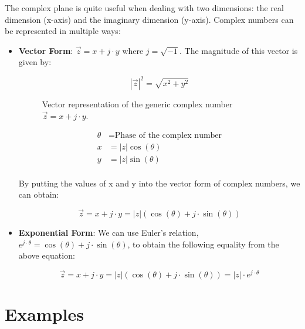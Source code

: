 \documentclass[letterpaper,12pt]{article}
\begin{document}
The complex plane is quite useful when dealing with two dimensions: the real
dimension (x-axis) and the imaginary dimension (y-axis). Complex numbers can be
represented in multiple ways:
\begin{itemize}
    \item \textbf{Vector Form}: \(\Vec{z} = x + j\cdot y\) where $j=\sqrt{-1}$. The magnitude of this vector is given by:

          \[|\Vec{z}|^2 = \sqrt{x^2 + y^2}\]

          \begin{figure}[!ht]
              \centering
              \caption{Vector representation of the generic complex number \(\Vec{z} = x + j\cdot y\).}\label{fig:signal_vector_graph}
          \end{figure}

          \begin{align*}
              \theta & = \text{Phase of the complex number} \\
              x      & = |z|\cos(\theta)                    \\
              y      & = |z|\sin(\theta)                    \\
          \end{align*}

          By putting the values of x and y into the vector form of complex numbers, we
          can obtain:

          \[\Vec{z} = x + j\cdot y = |z|(\cos(\theta) + j\cdot \sin(\theta))\]

    \item \textbf{Exponential Form}: We can use Euler's relation, \(e^{j\cdot \theta} = \cos(\theta) + j\cdot \sin(\theta)\), to obtain the following equality from the above equation:

          \begin{equation}
              \Vec{z} = x + j\cdot y = |z|(\cos(\theta) + j\cdot \sin(\theta)) = |z|\cdot e^{j\cdot \theta}
              \label{eq:euler_complex_no}
          \end{equation}

\end{itemize}

\section{Examples}
\end{document}
